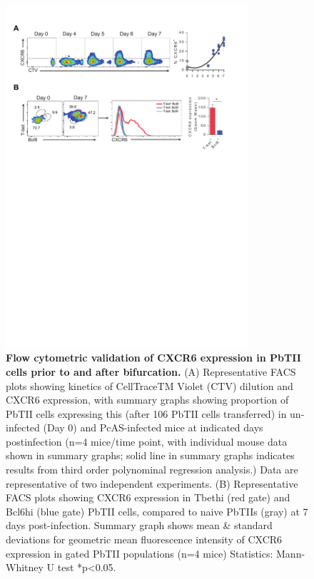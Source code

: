 \begin{figure}
    \centering
    \includegraphics[width=0.8\textwidth]{"Fig S13 rev3"}
    \caption[Flow cytometric validation of CXCR6 expression in PbTII cells prior to and after bifurcation]{\textbf{Flow cytometric validation of CXCR6 expression in PbTII cells prior to and after bifurcation.} (A) Representative FACS plots showing kinetics of CellTraceTM Violet (CTV) dilution and CXCR6 expression, with summary graphs showing proportion of PbTII cells expressing this (after 106 PbTII cells transferred) in un-infected (Day 0) and PcAS-infected mice at indicated days postinfection (n=4 mice/time point, with individual mouse data shown in summary graphs; solid line in summary graphs indicates results from third order polynominal regression analysis.) Data are representative of two independent experiments. (B) Representative FACS plots showing CXCR6 expression in Tbethi (red gate) and Bcl6hi (blue gate) PbTII cells, compared to naive PbTIIs (gray) at 7 days post-infection. Summary graph shows mean \& standard deviations for geometric mean fluorescence intensity of CXCR6 expression in gated PbTII populations (n=4 mice) Statistics: Mann-Whitney U test *p<0.05.}
    \label{fig:ms13}
\end{figure}

